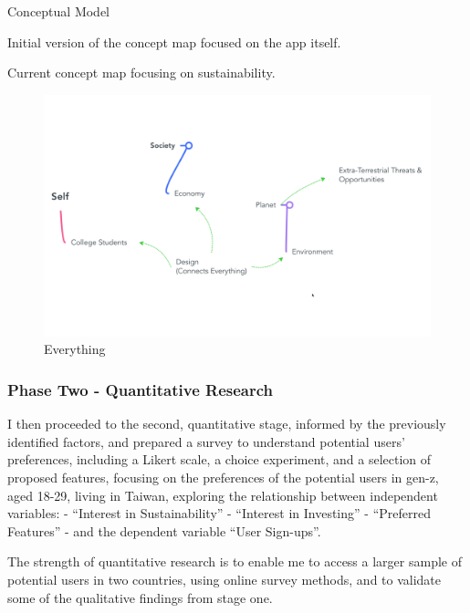 \documentclass[
  12pt,
  letterpaper,
  DIV=11,
  numbers=noendperiod]{scrartcl}
\begin{document}
Conceptual Model

Initial version of the concept map focused on the app itself.

Current concept map focusing on sustainability.

\begin{figure}[H]

{\centering \includegraphics[width=1\linewidth,height=\textheight,keepaspectratio]{./images/discussion/everything.png}

}

\caption{Everything}

\end{figure}%

\subsubsection{Phase Two - Quantitative
Research}\label{phase-two---quantitative-research}

I then proceeded to the second, quantitative stage, informed by the
previously identified factors, and prepared a survey to understand
potential users' preferences, including a Likert scale, a choice
experiment, and a selection of proposed features, focusing on the
preferences of the potential users in gen-z, aged 18-29, living in
Taiwan, exploring the relationship between independent variables: -
``Interest in Sustainability'' - ``Interest in Investing'' - ``Preferred
Features'' - and the dependent variable ``User Sign-ups''.

The strength of quantitative research is to enable me to access a larger
sample of potential users in two countries, using online survey methods,
and to validate some of the qualitative findings from stage one.
\end{document}
